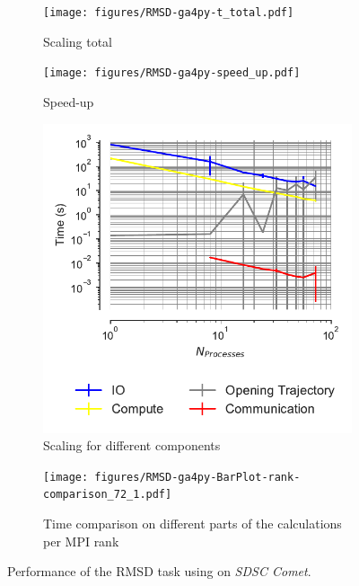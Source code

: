 \begin{figure}[!htb]
  \centering
  \begin{subfigure}{.49\textwidth}
    \texttt{[image: figures/RMSD-ga4py-t\_total.pdf]}
    \captionsetup{format=hang}
    \caption{Scaling total}
    \label{fig:MPIscaling-ga4py}
  \end{subfigure}
  \hfill
  \begin{subfigure}{.49\textwidth}
    \texttt{[image: figures/RMSD-ga4py-speed\_up.pdf]}
    \captionsetup{format=hang}
    \caption{Speed-up}
    \label{fig:MPIspeedup-ga4py}
  \end{subfigure}
  \bigskip

  \begin{subfigure}{.49\textwidth}
    \includegraphics[width=\linewidth]{figures/RMSD-ga4py-time_IO_comparison.pdf}
    \captionsetup{format=hang}
    \caption{Scaling for different components}
    \label{fig:ScalingComputeIO-ga4py}
  \end{subfigure}
  \hfill
  \begin{subfigure} {.5\textwidth}
    \texttt{[image: figures/RMSD-ga4py-BarPlot-rank-comparison\_72\_1.pdf]}
    \captionsetup{format=hang}
    \caption{Time comparison on different parts of the calculations per MPI rank}
    \label{fig:MPIranks-ga4py}
  \end{subfigure}
  \caption{Performance of the RMSD task using  on \emph{SDSC Comet}.
}
\end{figure}
